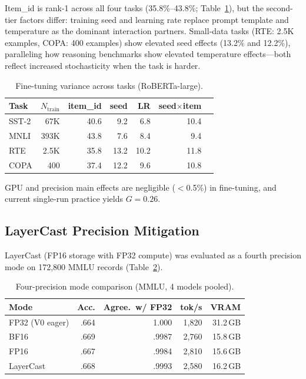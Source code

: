 \documentclass[11pt]{article}
\begin{document}
Item\_id is rank-1 across all four tasks (35.8\%--43.8\%; Table~\ref{tab:finetune_tasks}), but the second-tier factors differ: training seed and learning rate replace prompt template and temperature as the dominant interaction partners. Small-data tasks (RTE: 2.5K examples, COPA: 400 examples) show elevated seed effects (13.2\% and 12.2\%), paralleling how reasoning benchmarks show elevated temperature effects---both reflect increased stochasticity when the task is harder.

\begin{table}[t]
\centering
\caption{Fine-tuning variance across tasks (RoBERTa-large).}
\label{tab:finetune_tasks}
\small
\begin{tabular}{lrrrrrr}
\toprule
Task & $N_\text{train}$ & item\_id & seed & LR & seed$\times$item \\
\midrule
SST-2 & 67K & 40.6 & 9.2 & 6.8 & 10.4 \\
MNLI & 393K & 43.8 & 7.6 & 8.4 & 9.4 \\
RTE & 2.5K & 35.8 & 13.2 & 10.2 & 11.8 \\
COPA & 400 & 37.4 & 12.2 & 9.6 & 10.8 \\
\bottomrule
\end{tabular}
\end{table}

GPU and precision main effects are negligible ($<$0.5\%) in fine-tuning, and current single-run practice yields $G = 0.26$.

\subsection{LayerCast Precision Mitigation}
\label{sec:layercast}

LayerCast (FP16 storage with FP32 compute) was evaluated as a fourth precision mode on 172{,}800 MMLU records (Table~\ref{tab:layercast}).

\begin{table}[t]
\centering
\caption{Four-precision mode comparison (MMLU, 4 models pooled).}
\label{tab:layercast}
\small
\begin{tabular}{lrrrr}
\toprule
Mode & Acc. & Agree.\ w/ FP32 & tok/s & VRAM \\
\midrule
FP32 (V0 eager) & .664 & 1.000 & 1{,}820 & 31.2\,GB \\
BF16 & .669 & .9987 & 2{,}760 & 15.8\,GB \\
FP16 & .667 & .9984 & 2{,}810 & 15.6\,GB \\
LayerCast & .668 & .9993 & 2{,}580 & 16.2\,GB \\
\bottomrule
\end{tabular}
\end{table}
\end{document}
